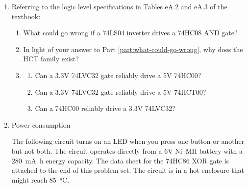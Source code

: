\documentclass{ps}
\begin{document}
\begin{enumerate}
\item Referring to the logic level specifications in Tables eA.2 and
  eA.3 of the textbook:
  \begin{enumerate}
  \item \label{part:what-could-go-wrong} What could go wrong if a
    74LS04 inverter drives a 74HC08 AND gate?
    \begin{solution}
    \end{solution}
  \item In light of your answer to Part
    \ref{part:what-could-go-wrong}, why does the HCT family exist?
    \begin{solution}
    \end{solution}
  \item
    \begin{enumerate}
    \item Can a 3.3V 74LVC32 gate reliably drive a 5V 74HC00?
      \begin{solution}
      \end{solution}
    \item Can a 3.3V 74LVC32 gate reliably drive a 5V 74HCT00?
      \begin{solution}
      \end{solution}
    \item Can a 74HC00 reliably drive a 3.3V 74LVC32?
      \begin{solution}
      \end{solution}
    \end{enumerate}
  \end{enumerate}

\item Power consumption

  The following circuit turns on an LED when you press one button or
  another but not both.  The circuit operates directly from a 6V
  Ni--MH battery with a \SI{280}{\mA\hour} energy capacity.  The data
  sheet for the 74HC86 XOR gate is attached to the end of this problem
  set.  The circuit is in a hot enclosure that might reach
  \SI{85}{\celsius}.
  \begin{center}


\end{center}
\end{enumerate}
\end{document}
